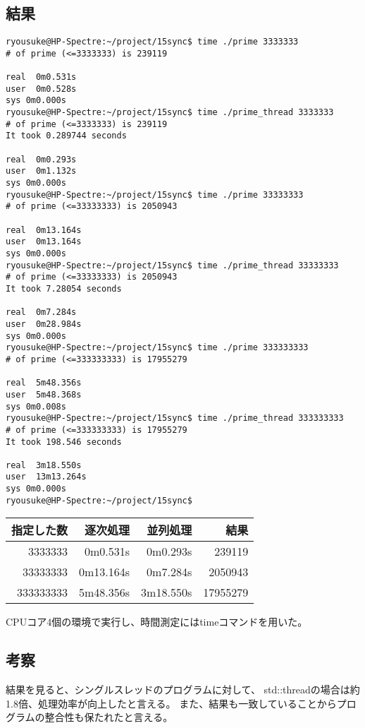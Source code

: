 \documentclass[a4j]{jarticle}
\begin{document}
\subsection{結果}
\begin{screen}
\begin{verbatim}
ryousuke@HP-Spectre:~/project/15sync$ time ./prime 3333333
# of prime (<=3333333) is 239119

real  0m0.531s
user  0m0.528s
sys 0m0.000s
ryousuke@HP-Spectre:~/project/15sync$ time ./prime_thread 3333333
# of prime (<=3333333) is 239119
It took 0.289744 seconds

real  0m0.293s
user  0m1.132s
sys 0m0.000s
ryousuke@HP-Spectre:~/project/15sync$ time ./prime 33333333
# of prime (<=33333333) is 2050943

real  0m13.164s
user  0m13.164s
sys 0m0.000s
ryousuke@HP-Spectre:~/project/15sync$ time ./prime_thread 33333333
# of prime (<=33333333) is 2050943
It took 7.28054 seconds

real  0m7.284s
user  0m28.984s
sys 0m0.000s
ryousuke@HP-Spectre:~/project/15sync$ time ./prime 333333333
# of prime (<=333333333) is 17955279

real  5m48.356s
user  5m48.368s
sys 0m0.008s
ryousuke@HP-Spectre:~/project/15sync$ time ./prime_thread 333333333
# of prime (<=333333333) is 17955279
It took 198.546 seconds

real  3m18.550s
user  13m13.264s
sys 0m0.000s
ryousuke@HP-Spectre:~/project/15sync$ 
\end{verbatim}
\end{screen}

\begin{table}[htb]
\begin{center}
\begin{tabular}{|r|r|r|r|} \hline
指定した数 & 逐次処理 & 並列処理 & 結果 \\ \hline
3333333 & 0m0.531s & 0m0.293s & 239119 \\
33333333 & 0m13.164s & 0m7.284s & 2050943 \\
333333333 & 5m48.356s & 3m18.550s & 17955279 \\ \hline
\end{tabular}
\end{center}
\end{table}
CPUコア4個の環境で実行し、時間測定にはtimeコマンドを用いた。

\subsection{考察}
結果を見ると、シングルスレッドのプログラムに対して、
std::threadの場合は約1.8倍、処理効率が向上したと言える。
また、結果も一致していることからプログラムの整合性も保たれたと言える。
\end{document}
